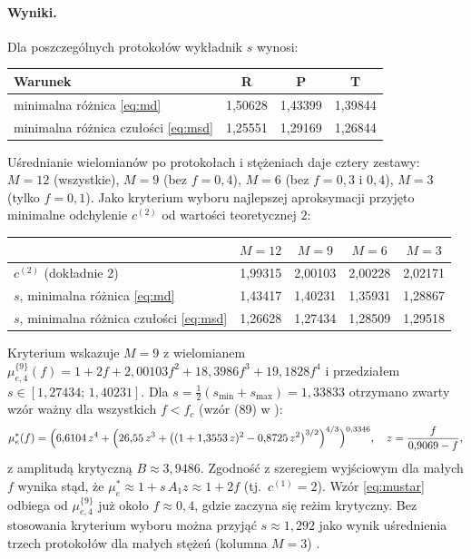 \documentclass[12pt,a4paper,twoside,openright]{report}
\theoremstyle{definition}
\theoremstyle{remark}
\begin{document}
\paragraph{Wyniki.} Dla poszczególnych protokołów wykładnik $s$ wynosi:
\begin{center}\small
\begin{tabular}{@{}lccc@{}}
\toprule
Warunek & R & P & T\\ \midrule
minimalna różnica \eqref{eq:md} & 1,50628 & 1,43399 & 1,39844\\
minimalna różnica czułości \eqref{eq:msd} & 1,25551 & 1,29169 & 1,26844\\ \bottomrule
\end{tabular}
\end{center}
Uśrednianie wielomianów po protokołach i stężeniach daje cztery zestawy: $M=12$ (wszystkie), $M=9$ (bez $f=0{,}4$), $M=6$ (bez $f=0{,}3$ i $0{,}4$), $M=3$ (tylko $f=0{,}1$). Jako kryterium wyboru najlepszej aproksymacji przyjęto minimalne odchylenie $c^{(2)}$ od wartości teoretycznej $2$:
\begin{center}\small
\begin{tabular}{@{}lcccc@{}}
\toprule
 & $M=12$ & $M=9$ & $M=6$ & $M=3$\\ \midrule
$c^{(2)}$ (dokładnie 2) & 1,99315 & 2,00103 & 2,00228 & 2,02171\\
$s$, minimalna różnica \eqref{eq:md} & 1,43417 & 1,40231 & 1,35931 & 1,28867\\
$s$, minimalna różnica czułości \eqref{eq:msd} & 1,26628 & 1,27434 & 1,28509 & 1,29518\\ \bottomrule
\end{tabular}
\end{center}
Kryterium wskazuje $M=9$ z wielomianem $\mu^{\{9\}}_{e,4}(f)=1+2f+2{,}00103f^2+18{,}3986f^3+19{,}1828f^4$ i przedziałem $s\in[1{,}27434;\,1{,}40231]$. Dla $s=\tfrac12(s_{\min}+s_{\max})=1{,}33833$ otrzymano zwarty wzór ważny dla wszystkich $f<f_c$ (wzór (89) w \cite{czapla2025computational}):
\begin{equation}\label{eq:mustar}
\mu_e^*(f)=\Bigl(6{,}6104\,z^4+\Bigl(26{,}55\,z^3+\bigl((1+1{,}3553\,z)^2-0{,}8725\,z^2\bigr)^{3/2}\Bigr)^{4/3}\Bigr)^{0{,}3346},\quad z=\frac{f}{0{,}9069-f},
\end{equation}
z amplitudą krytyczną $B\approx3{,}9486$. Zgodność z szeregiem wyjściowym dla małych $f$ wynika stąd, że $\mu_e^*\approx1+s\,A_1 z\approx1+2f$ (tj.\ $c^{(1)}=2$). Wzór \eqref{eq:mustar} odbiega od $\mu^{\{9\}}_{e,4}$ już około $f\approx0{,}4$, gdzie zaczyna się reżim krytyczny. Bez stosowania kryterium wyboru można przyjąć $s\approx1{,}292$ jako wynik uśrednienia trzech protokołów dla małych stężeń (kolumna $M=3$) \cite{czapla2025computational}.
\end{document}
